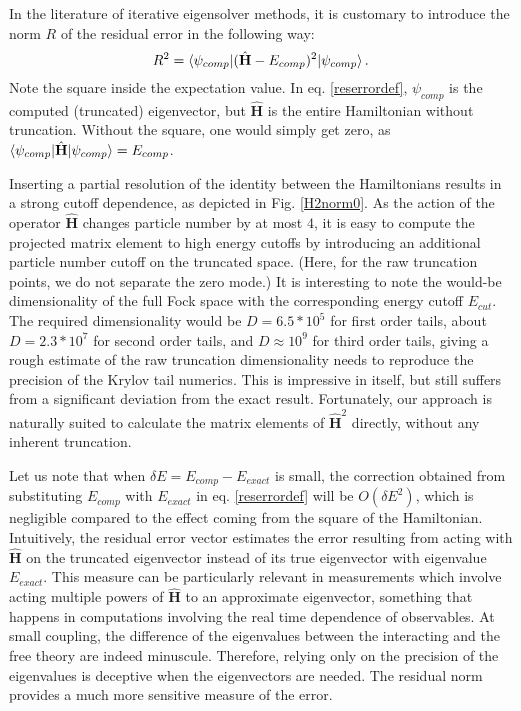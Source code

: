 \documentclass[twocolumn,secnumarabic,amssymb, nobibnotes, aps, prd]{revtex4-2}
\newcommand{\be}{\begin{equation}}
\newcommand{\ee}{\end{equation}}
\begin{document}
In the literature of iterative eigensolver methods, it is customary to introduce the norm $R$ of the residual error in the following way:
\be
R^2=\braket{\psi_{comp}|(\hat{\mathbf{H}}-E_{comp})^2|\psi_{comp}}.\label{reserrordef}
\ee
Note the square inside the expectation value. In eq. \eqref{reserrordef}, $\psi_{comp}$ is the computed (truncated) eigenvector, but $\hat{\mathbf{H}}$ is the entire Hamiltonian without truncation. Without the square, one would simply get zero, as $\braket{\psi_{comp}|\hat{\mathbf{H}}|\psi_{comp}}=E_{comp}$.

Inserting a partial resolution of the identity between the Hamiltonians results in a strong cutoff dependence, as depicted in Fig. \ref{H2norm0}. 
As the action of the operator $\hat{\mathbf{H}}$ changes particle number by at most $4$, it is easy to compute the projected matrix element to high energy cutoffs by introducing an additional particle number cutoff on the truncated space. (Here, for the raw truncation points, we do not separate the zero mode.) It is interesting to note the would-be dimensionality of the full Fock space with the corresponding energy cutoff $E_{cut}$. The required dimensionality would be $D=6.5*10^5$ for first order tails, about $D=2.3*10^7$ for second order tails, and $D\approx10^9$ for third order tails, giving a rough estimate of the raw truncation dimensionality needs to reproduce the precision of the Krylov tail numerics. This is impressive in itself, but still suffers from a significant deviation from the exact result.
Fortunately, our approach is naturally suited to calculate the matrix elements of $\hat{\mathbf{H}}^2$ directly, without any inherent truncation.

Let us note that when $\delta E= E_{comp}-E_{exact}$ is small, the correction obtained from substituting $E_{comp}$ with $E_{exact}$ in eq. \eqref{reserrordef} will be $O(\delta E^2)$, which is negligible compared to the effect coming from the square of the Hamiltonian. Intuitively, the residual error vector estimates the error resulting from acting with $\hat{\mathbf{H}}$ on the truncated eigenvector instead of its true eigenvector with eigenvalue $E_{exact}$. This measure can be particularly relevant in measurements which involve acting multiple powers of $\hat{\mathbf{H}}$ to an approximate eigenvector, something that happens in computations involving the real time dependence of observables.
At small coupling, the difference of the eigenvalues between the interacting and the free theory are indeed minuscule. Therefore, relying only on the precision of the eigenvalues is deceptive when the eigenvectors are needed. The residual norm provides a much more sensitive measure of the error.
\end{document}
